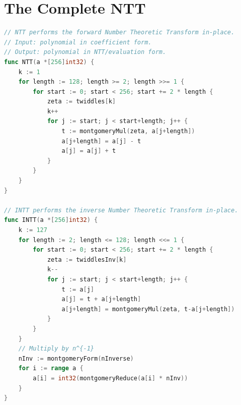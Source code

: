 \section{The Complete NTT}


\begin{lstlisting}[language=Go,caption={Complete forward NTT in Go}]
// NTT performs the forward Number Theoretic Transform in-place.
// Input: polynomial in coefficient form.
// Output: polynomial in NTT/evaluation form.
func NTT(a *[256]int32) {
    k := 1
    for length := 128; length >= 2; length >>= 1 {
        for start := 0; start < 256; start += 2 * length {
            zeta := twiddles[k]
            k++
            for j := start; j < start+length; j++ {
                t := montgomeryMul(zeta, a[j+length])
                a[j+length] = a[j] - t
                a[j] = a[j] + t
            }
        }
    }
}

// INTT performs the inverse Number Theoretic Transform in-place.
func INTT(a *[256]int32) {
    k := 127
    for length := 2; length <= 128; length <<= 1 {
        for start := 0; start < 256; start += 2 * length {
            zeta := twiddlesInv[k]
            k--
            for j := start; j < start+length; j++ {
                t := a[j]
                a[j] = t + a[j+length]
                a[j+length] = montgomeryMul(zeta, t-a[j+length])
            }
        }
    }
    // Multiply by n^{-1}
    nInv := montgomeryForm(nInverse)
    for i := range a {
        a[i] = int32(montgomeryReduce(a[i] * nInv))
    }
}
\end{lstlisting}

